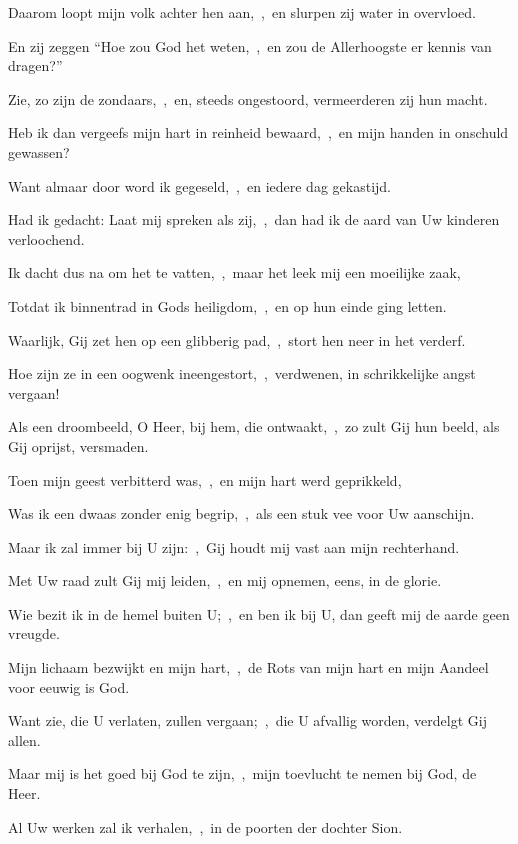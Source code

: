 \documentclass[12pt,twoside,a5paper]{article}
\begin{document}

\begin{halfparskip}
  Daarom loopt mijn volk achter hen aan,~\sep\ en slurpen zij water in overvloed.

  En zij zeggen ``Hoe zou God het weten,~\sep\ en zou de Allerhoogste er kennis van dragen?''

  Zie, zo zijn de zondaars,~\sep\ en, steeds ongestoord, vermeerderen zij hun macht.
\end{halfparskip}


\begin{halfparskip}
  Heb ik dan vergeefs mijn hart in reinheid bewaard,~\sep\ en mijn handen in onschuld gewassen?

  Want almaar door word ik gegeseld,~\sep\ en iedere dag gekastijd.

  Had ik gedacht: Laat mij spreken als zij,~\sep\ dan had ik de aard van Uw kinderen verloochend.

  Ik dacht dus na om het te vatten,~\sep\ maar het leek mij een moeilijke zaak,

  Totdat ik binnentrad in Gods heiligdom,~\sep\ en op hun einde ging letten.
\end{halfparskip}


\begin{halfparskip}
  Waarlijk, Gij zet hen op een glibberig pad,~\sep\ stort hen neer in het verderf.

  Hoe zijn ze in een oogwenk ineengestort,~\sep\ verdwenen, in schrikkelijke angst vergaan!

  Als een droombeeld, O Heer, bij hem, die ontwaakt,~\sep\ zo zult Gij hun beeld, als Gij oprijst, versmaden.

  Toen mijn geest verbitterd was,~\sep\ en mijn hart werd geprikkeld,

  Was ik een dwaas zonder enig begrip,~\sep\ als een stuk vee voor Uw aanschijn.
\end{halfparskip}


\begin{halfparskip}
  Maar ik zal immer bij U zijn:~\sep\ Gij houdt mij vast aan mijn rechterhand.

  Met Uw raad zult Gij mij leiden,~\sep\ en mij opnemen, eens, in de glorie.

  Wie bezit ik in de hemel buiten U;~\sep\ en ben ik bij U, dan geeft mij de aarde geen vreugde.

  Mijn lichaam bezwijkt en mijn hart,~\sep\ de Rots van mijn hart en mijn Aandeel voor eeuwig is God.

  Want zie, die U verlaten, zullen vergaan;~\sep\ die U afvallig worden, verdelgt Gij allen.

  Maar mij is het goed bij God te zijn,~\sep\ mijn toevlucht te nemen bij God, de Heer.

  Al Uw werken zal ik verhalen,~\sep\ in de poorten der dochter Sion.
\end{halfparskip}
\end{document}
